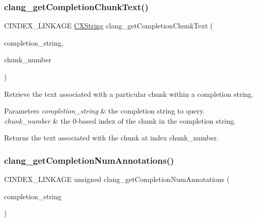 \subsubsection{\texorpdfstring{clang\+\_\+get\+Completion\+Chunk\+Text()}{clang\_getCompletionChunkText()}}
{\footnotesize\ttfamily C\+I\+N\+D\+E\+X\+\_\+\+L\+I\+N\+K\+A\+GE \mbox{\hyperlink{structCXString}{C\+X\+String}} clang\+\_\+get\+Completion\+Chunk\+Text (\begin{DoxyParamCaption}\item[{\mbox{\hyperlink{group__CINDEX__CODE__COMPLET_gafea23a43a60ec3b4f3bedccfbb76883a}{C\+X\+Completion\+String}}}]{completion\+\_\+string,  }\item[{unsigned}]{chunk\+\_\+number }\end{DoxyParamCaption})}



Retrieve the text associated with a particular chunk within a completion string. 


\begin{DoxyParams}{Parameters}
{\em completion\+\_\+string} & the completion string to query.\\
\hline
{\em chunk\+\_\+number} & the 0-\/based index of the chunk in the completion string.\\
\hline
\end{DoxyParams}
\begin{DoxyReturn}{Returns}
the text associated with the chunk at index {\ttfamily chunk\+\_\+number}. 
\end{DoxyReturn}
\mbox{\label{group__CINDEX__CODE__COMPLET_gadce9960ed8d554f497eda0457a3d52f9}} 
\subsubsection{\texorpdfstring{clang\+\_\+get\+Completion\+Num\+Annotations()}{clang\_getCompletionNumAnnotations()}}
{\footnotesize\ttfamily C\+I\+N\+D\+E\+X\+\_\+\+L\+I\+N\+K\+A\+GE unsigned clang\+\_\+get\+Completion\+Num\+Annotations (\begin{DoxyParamCaption}\item[{\mbox{\hyperlink{group__CINDEX__CODE__COMPLET_gafea23a43a60ec3b4f3bedccfbb76883a}{C\+X\+Completion\+String}}}]{completion\+\_\+string }\end{DoxyParamCaption})}



